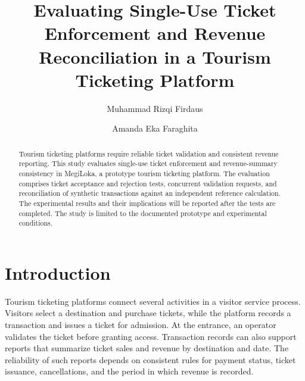\documentclass[runningheads]{llncs}
\begin{document}
\title{Evaluating Single-Use Ticket Enforcement and Revenue
Reconciliation in a Tourism Ticketing Platform}


\author{
Muhammad Rizqi Firdaus \and
Amanda Eka Faraghita
}



\maketitle

\begin{abstract}
Tourism ticketing platforms require reliable ticket validation and
consistent revenue reporting. This study evaluates single-use ticket
enforcement and revenue-summary consistency in MegiLoka, a prototype
tourism ticketing platform. The evaluation comprises ticket acceptance
and rejection tests, concurrent validation requests, and reconciliation
of synthetic transactions against an independent reference calculation.
The experimental results and their implications will be reported after
the tests are completed. The study is limited to the documented
prototype and experimental conditions.

\end{abstract}

\section{Introduction}

Tourism ticketing platforms connect several activities in a visitor
service process. Visitors select a destination and purchase tickets,
while the platform records a transaction and issues a ticket for
admission. At the entrance, an operator validates the ticket before
granting access. Transaction records can also support reports that
summarize ticket sales and revenue by destination and date. The
reliability of such reports depends on consistent rules for payment
status, ticket issuance, cancellations, and the period in which
revenue is recorded.
\end{document}
